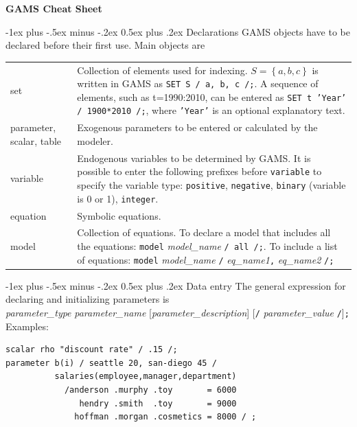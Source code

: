 \documentclass[10pt,landscape,a4paper]{article}
\makeatletter
\renewcommand{\section}{\@startsection{section}{1}{0mm}%
                                {-1ex plus -.5ex minus -.2ex}%
                                {0.5ex plus .2ex}%
                                {\color{blue}\normalfont\large\bfseries}}
\makeatother
\begin{document}
\raggedright
\footnotesize
\begin{multicols}{2}


\setlength{\premulticols}{1pt}
\setlength{\postmulticols}{1pt}
\setlength{\multicolsep}{1pt}
\setlength{\columnsep}{2pt}

\begin{center}
     \Large{\textbf{GAMS Cheat Sheet}} \\
\end{center}

\section{Declarations}
GAMS objects have to be declared before their first use. Main objects are\\
\begin{tabularx}{\columnwidth}{@{}>{\ttfamily}l>{\raggedright\arraybackslash}X@{}}
  set & Collection of elements used for indexing. $S=\left\{a,b,c\right\}$ is
  written in GAMS as \texttt{SET S / a, b, c /;}. A sequence of elements, such
  as t=1990:2010, can be entered as
  \texttt{SET t 'Year' / 1900*2010 /;}, where \texttt{'Year'} is an optional
  explanatory text.\\
  parameter\textrm{, }scalar\textrm{, }table & Exogenous parameters to be
  entered
  or calculated by the modeler. \\
  variable & Endogenous variables to be determined by GAMS. It is possible to
  enter the following prefixes before \texttt{variable} to specify the variable
  type:
  \texttt{positive}, \texttt{negative}, \texttt{binary} (variable is 0 or 1), \texttt{integer}.\\
  equation   & Symbolic equations. \\
  model & Collection of equations. To declare a model that includes all the
  equations:\linebreak{} \texttt{model} \emph{model\_name} \texttt{/ all
    /;}. \linebreak{}To include a list of equations:\linebreak{} \texttt{model}
  \emph{model\_name} \texttt{/} \emph{eq\_name1}\texttt{,} \emph{eq\_name2}
  \texttt{/;}
\end{tabularx}

\section{Data entry}
The general expression for declaring and initializing parameters is\\
\emph{parameter\_type} \emph{parameter\_name} [\emph{parameter\_description}] [\verb!/!
\emph{parameter\_value} \verb!/!]\verb!;!\\
Examples:
\begin{verbatim}
scalar rho "discount rate" / .15 /;
parameter b(i) / seattle 20, san-diego 45 /
          salaries(employee,manager,department)
            /anderson .murphy .toy       = 6000
               hendry .smith  .toy       = 9000
              hoffman .morgan .cosmetics = 8000 / ;
\end{verbatim}


\end{multicols}
\end{document}
